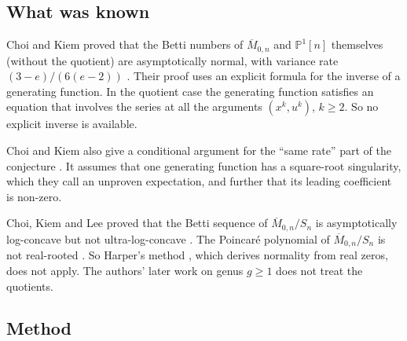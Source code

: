 \documentclass[11pt]{amsart}
\theoremstyle{definition}
\theoremstyle{remark}
\numberwithin{equation}{section}
\newcommand{\Mbar}{\overline{M}}
\newcommand{\PP}{\mathbb{P}}
\begin{document}
\subsection{What was known}

Choi and Kiem proved that the Betti numbers of \(\Mbar_{0,n}\) and \(\PP^1[n]\) themselves (without the quotient) are asymptotically normal, with variance rate \((3-e)/(6(e-2))\) \cite[Thm.~3.1 and \S4]{CK}. Their proof uses an explicit formula for the inverse of a generating function. In the quotient case the generating function satisfies an equation that involves the series at all the arguments \((x^k,u^k)\), \(k\ge2\). So no explicit inverse is available.

Choi and Kiem also give a conditional argument for the ``same rate'' part of the conjecture \cite[Appendix]{CK}. It assumes that one generating function has a square-root singularity, which they call an unproven expectation, and further that its leading coefficient is non-zero.

Choi, Kiem and Lee proved that the Betti sequence of \(\Mbar_{0,n}/S_n\) is asymptotically log-concave but not ultra-log-concave \cite[Cor.~6.10--6.11]{CKL}. The Poincar\'e polynomial of \(\Mbar_{0,n}/S_n\) is not real-rooted \cite[\S4]{BK}. So Harper's method \cite{Ha}, which derives normality from real zeros, does not apply. The authors' later work on genus \(g\ge1\) \cite{CK3} does not treat the quotients.

\subsection{Method}
\end{document}
